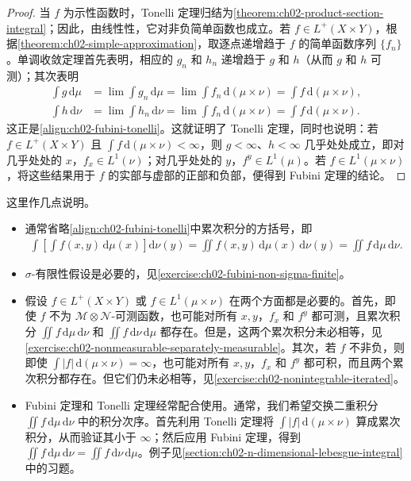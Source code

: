 \documentclass[../../main.tex]{subfiles}%
\begin{document}
\begin{proof}
当 $f$ 为示性函数时，Tonelli 定理归结为\cref{theorem:ch02-product-section-integral}；因此，由线性性，它对非负简单函数也成立。若 $f\in L^+(X\times Y)$，根据\cref{theorem:ch02-simple-approximation}，取逐点递增趋于 $f$ 的简单函数序列 $\{f_n\}$。单调收敛定理首先表明，相应的 $g_n$ 和 $h_n$ 递增趋于 $g$ 和 $h$（从而 $g$ 和 $h$ 可测）；其次表明
\begin{align*}
\int g\,\mathrm{d}\mu&=\lim\int g_n\,\mathrm{d}\mu=\lim\int f_n\,\mathrm{d}(\mu\times\nu)=\int f\,\mathrm{d}(\mu\times\nu),\\
\int h\,\mathrm{d}\nu&=\lim\int h_n\,\mathrm{d}\nu=\lim\int f_n\,\mathrm{d}(\mu\times\nu)=\int f\,\mathrm{d}(\mu\times\nu).
\end{align*}
这正是\eqref{align:ch02-fubini-tonelli}。这就证明了 Tonelli 定理，同时也说明：若 $f\in L^+(X\times Y)$ 且 $\int f\,\mathrm{d}(\mu\times\nu)<\infty$，则 $g<\infty$、$h<\infty$ 几乎处处成立，即对几乎处处的 $x$，$f_x\in L^1(\nu)$；对几乎处处的 $y$，$f^y\in L^1(\mu)$。若 $f\in L^1(\mu\times\nu)$，将这些结果用于 $f$ 的实部与虚部的正部和负部，便得到 Fubini 定理的结论。
\end{proof}
\begin{remark}
这里作几点说明。
\begin{itemize}
\item 通常省略\eqref{align:ch02-fubini-tonelli}中累次积分的方括号，即
\begin{align*}
\int\left[\int f(x,y)\,\mathrm{d}\mu(x)\right]\mathrm{d}\nu(y)
=\iint f(x,y)\,\mathrm{d}\mu(x)\,\mathrm{d}\nu(y)=\iint f\,\mathrm{d}\mu\,\mathrm{d}\nu.
\end{align*}
\item $\sigma$-有限性假设是必要的，见\cref{exercise:ch02-fubini-non-sigma-finite}。
\item 假设 $f\in L^+(X\times Y)$ 或 $f\in L^1(\mu\times\nu)$ 在两个方面都是必要的。首先，即使 $f$ 不为 $\mathscr{M}\otimes\mathscr{N}$-可测函数，也可能对所有 $x,y$，$f_x$ 和 $f^y$ 都可测，且累次积分 $\iint f\,\mathrm{d}\mu\,\mathrm{d}\nu$ 和 $\iint f\,\mathrm{d}\nu\,\mathrm{d}\mu$ 都存在。但是，这两个累次积分未必相等，见\cref{exercise:ch02-nonmeasurable-separately-measurable}。其次，若 $f$ 不非负，则即使 $\int|f|\,\mathrm{d}(\mu\times\nu)=\infty$，也可能对所有 $x,y$，$f_x$ 和 $f^y$ 都可积，而且两个累次积分都存在。但它们仍未必相等，见\cref{exercise:ch02-nonintegrable-iterated}。
\item Fubini 定理和 Tonelli 定理经常配合使用。通常，我们希望交换二重积分 $\iint f\,\mathrm{d}\mu\,\mathrm{d}\nu$ 中的积分次序。首先利用 Tonelli 定理将 $\int|f|\,\mathrm{d}(\mu\times\nu)$ 算成累次积分，从而验证其小于 $\infty$；然后应用 Fubini 定理，得到 $\iint f\,\mathrm{d}\mu\,\mathrm{d}\nu=\iint f\,\mathrm{d}\nu\,\mathrm{d}\mu$。例子见\cref{section:ch02-n-dimensional-lebesgue-integral}中的习题。
\end{itemize}
\end{remark}
\end{document}
